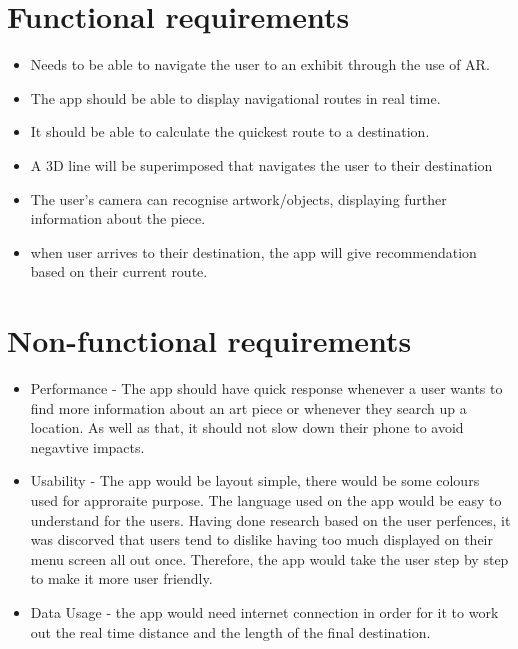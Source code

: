 \section{Functional requirements}
\begin{itemize}
        \item Needs to be able to navigate the user to an exhibit through the use of AR.
        \item The app should be able to display navigational routes in real time.
        \item It should be able to calculate the quickest route to a destination.
        \item A 3D line will be superimposed that navigates the user to their destination
        \item The user’s camera can recognise artwork/objects, displaying further information about the piece.
        \item when user arrives to their destination, the app will give recommendation based on their current route.
\end{itemize}

\section{Non-functional requirements}
\begin{itemize}
        \item Performance -  The app should have quick response whenever a user wants to find more information about an art piece or whenever they search up a location. As well as that, it should not slow down their phone to avoid negavtive impacts.
        \item Usability - The app would be layout simple, there would be some colours used for approraite purpose. The language used on the app would be easy to understand for the users. Having done research based on the user perfences, it was discorved that users tend to dislike having too much displayed on their menu screen all out once. Therefore, the app would take the user step by step to make it more user friendly.
        \item Data Usage - the app would need internet connection in order for it to work out the real time distance and the length of the final destination.
\end{itemize}
    
